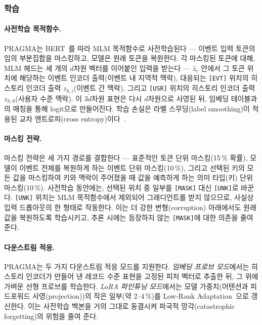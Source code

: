 \subsubsection{학습}
\label{sec:training}
\paragraph*{사전학습 목적함수.}
PRAGMA는 BERT~\citep{devlin2019bert}를 따라 MLM 목적함수로 사전학습된다 — 이벤트 입력 토큰의 임의 부분집합을 마스킹하고, 모델은 원래 토큰을 복원한다.
각 마스킹된 토큰에 대해, MLM 헤드는 세 개의 $d$차원 벡터를 이어붙인 입력을 받는다 — $\widehat{z}_e$ 안에서 그 토큰 위치에 해당하는 이벤트 인코더 출력(이벤트 내 지역적 맥락), 대응되는 \texttt{[EVT]} 위치의 히스토리 인코더 출력 $z_{h,i}$(이벤트 간 맥락), 그리고 \texttt{[USR]} 위치의 히스토리 인코더 출력 $z_{h,0}$(사용자 수준 맥락).
이 $3d$차원 표현은 다시 $d$차원으로 사영된 뒤, 임베딩 테이블과의 매칭을 통해 logit으로 만들어진다.
학습 손실은 라벨 스무딩(label smoothing)이 적용된 교차 엔트로피(cross entropy)이다~\citep{szegedy2016rethinking}.

\paragraph*{마스킹 전략.}
마스킹 전략은 세 가지 경로를 결합한다 — 표준적인 토큰 단위 마스킹(15\,\% 확률), 모델이 이벤트 전체를 복원하게 하는 이벤트 단위 마스킹(10\,\%), 그리고 선택된 키의 모든 값을 마스킹하여 키와 맥락이 주어졌을 때 값을 예측하게 하는 의미 타입(키) 단위 마스킹(10\,\%).
사전학습 동안에는, 선택된 위치 중 일부를 \texttt{[MASK]} 대신 \texttt{[UNK]}로 바꾼다.
\texttt{[UNK]} 위치는 MLM 목적함수에서 제외되어 그래디언트를 받지 않으므로, 사실상 입력 드롭아웃의 한 형태로 작동한다. 이는 더 강한 변형(corruption) 아래에서도 원래 값을 복원하도록 학습시키고, 추론 시에는 등장하지 않는 \texttt{[MASK]}에 대한 의존을 줄여 준다.

\paragraph*{다운스트림 적응.}
PRAGMA는 두 가지 다운스트림 적응 모드를 지원한다.
\emph{임베딩 프로브 모드}에서는 히스토리 인코더가 만들어 낸 레코드 수준 표현을 고정된 피처 벡터로 추출한 뒤, 그 위에 가벼운 선형 프로브를 학습한다.
\emph{LoRA 파인튜닝 모드}에서는 모델 가중치(어텐션과 피드포워드 사영(projection))의 작은 일부(약 2--4\,\%)를 Low-Rank Adaptation~\citep{hu2022lora}으로 갱신한다. 이는 사전학습 백본을 거의 그대로 동결시켜 파국적 망각(catastrophic forgetting)의 위험을 줄여 준다.
